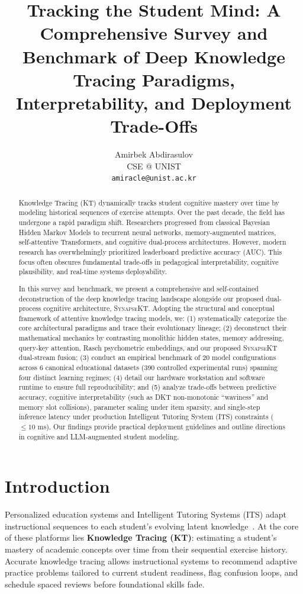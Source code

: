 \documentclass[11pt]{article}
\title{Tracking the Student Mind: A Comprehensive Survey and Benchmark of Deep Knowledge Tracing Paradigms, Interpretability, and Deployment Trade-Offs}
\author{Amirbek Abdirasulov \\ CSE @ UNIST\\
  \texttt{amiracle@unist.ac.kr} \\}
\begin{document}
\maketitle

\begin{abstract}
Knowledge Tracing (KT) dynamically tracks student cognitive mastery over time by modeling historical sequences of exercise attempts. Over the past decade, the field has undergone a rapid paradigm shift. Researchers progressed from classical Bayesian Hidden Markov Models to recurrent neural networks, memory-augmented matrices, self-attentive Transformers, and cognitive dual-process architectures. However, modern research has overwhelmingly prioritized leaderboard predictive accuracy (AUC). This focus often obscures fundamental trade-offs in pedagogical interpretability, cognitive plausibility, and real-time systems deployability.

In this survey and benchmark, we present a comprehensive and self-contained deconstruction of the deep knowledge tracing landscape alongside our proposed dual-process cognitive architecture, \textsc{SynapseKT}. Adopting the structural and conceptual framework of attentive knowledge tracing models, we: (1) systematically categorize the core architectural paradigms and trace their evolutionary lineage; (2) deconstruct their mathematical mechanics by contrasting monolithic hidden states, memory addressing, query-key attention, Rasch psychometric embeddings, and our proposed \textsc{SynapseKT} dual-stream fusion; (3) conduct an empirical benchmark of 20 model configurations across 6 canonical educational datasets (390 controlled experimental runs) spanning four distinct learning regimes; (4) detail our hardware workstation and software runtime to ensure full reproducibility; and (5) analyze trade-offs between predictive accuracy, cognitive interpretability (such as DKT non-monotonic ``waviness'' and memory slot collisions), parameter scaling under item sparsity, and single-step inference latency under production Intelligent Tutoring System (ITS) constraints ($\le 10$ ms). Our findings provide practical deployment guidelines and outline directions in cognitive and LLM-augmented student modeling.
\end{abstract}

\section{Introduction}
\label{sec:intro}

Personalized education systems and Intelligent Tutoring Systems (ITS) adapt instructional sequences to each student's evolving latent knowledge~\citep{corbett1994knowledge,piech2015deep}. At the core of these platforms lies \textbf{Knowledge Tracing (KT)}: estimating a student's mastery of academic concepts over time from their sequential exercise history. Accurate knowledge tracing allows instructional systems to recommend adaptive practice problems tailored to current student readiness, flag confusion loops, and schedule spaced reviews before foundational skills fade.
\end{document}
